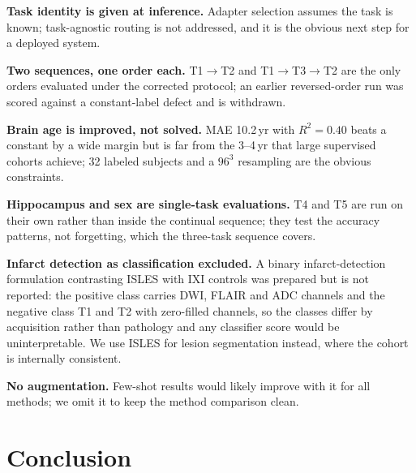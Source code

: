 \documentclass[journal,twoside,web]{ieeecolor}
\begin{document}
\textbf{Task identity is given at inference.} Adapter selection assumes the task is known; task-agnostic routing is not addressed, and it is the obvious next step for a deployed system.

\textbf{Two sequences, one order each.} T1$\to$T2 and T1$\to$T3$\to$T2 are the only orders evaluated under the corrected protocol; an earlier reversed-order run was scored against a constant-label defect and is withdrawn.

\textbf{Brain age is improved, not solved.} MAE 10.2\,yr with $R^2=0.40$ beats a constant by a wide margin but is far from the 3--4\,yr that large supervised cohorts achieve; 32 labeled subjects and a $96^3$ resampling are the obvious constraints.

\textbf{Hippocampus and sex are single-task evaluations.} T4 and T5 are run on their own rather than inside the continual sequence; they test the accuracy patterns, not forgetting, which the three-task sequence covers.

\textbf{Infarct detection as classification excluded.} A binary infarct-detection formulation contrasting ISLES with IXI controls was prepared but is not reported: the positive class carries DWI, FLAIR and ADC channels and the negative class T1 and T2 with zero-filled channels, so the classes differ by acquisition rather than pathology and any classifier score would be uninterpretable. We use ISLES for lesion segmentation instead, where the cohort is internally consistent.

\textbf{No augmentation.} Few-shot results would likely improve with it for all methods; we omit it to keep the method comparison clean.

\section{Conclusion}
\label{sec:conclusion}
\end{document}
